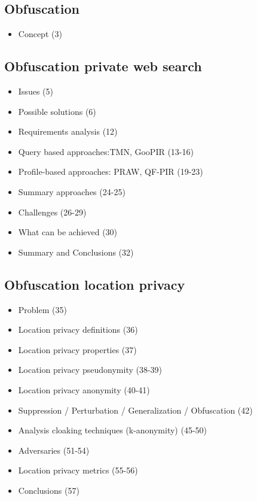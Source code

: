 \documentclass[../overview.tex]{subfiles}
\begin{document}

\subsection{Obfuscation}
\begin{itemize}
	\item Concept (3)
\end{itemize}

\subsection{Obfuscation private web search}
\begin{itemize}
	\item Issues (5)
	\item Possible solutions (6)
	\item Requirements analysis (12)
	\item Query based approaches:TMN, GooPIR (13-16)
	\item Profile-based approaches: PRAW, QF-PIR (19-23)
	\item Summary approaches (24-25)
	\item Challenges (26-29)
	\item What can be achieved (30)
	\item Summary and Conclusions (32)
\end{itemize}

\subsection{Obfuscation location privacy}
\begin{itemize}
	\item Problem (35)
	\item Location privacy definitions (36)
	\item Location privacy properties (37)
	\item Location privacy pseudonymity (38-39)
	\item Location privacy anonymity (40-41)
	\item Suppression / Perturbation / Generalization / Obfuscation (42)
	\item Analysis cloaking techniques (k-anonymity) (45-50)
	\item Adversaries (51-54)
	\item Location privacy metrics (55-56)
	\item Conclusions (57)
\end{itemize}
\end{document}
